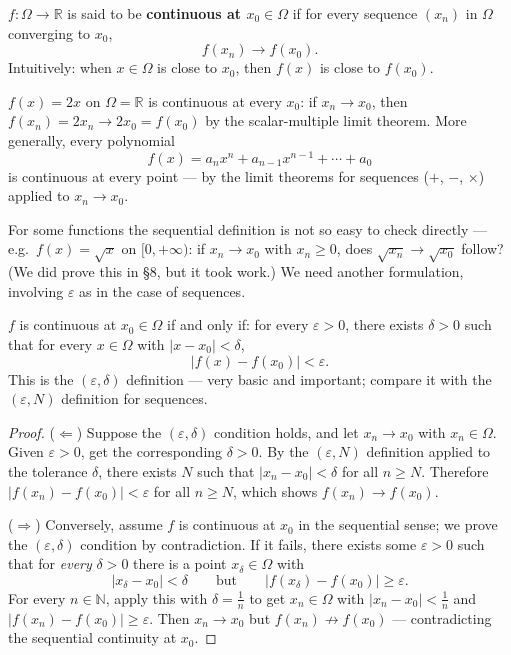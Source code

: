 \documentclass[11pt]{report}
\begin{document}
\begin{defbox}
$f: \Omega \to \mathbb{R}$ is said to be \textbf{continuous at $x_0 \in \Omega$} if for every sequence $(x_n)$ in $\Omega$ converging to $x_0$,
\[
f(x_n) \longrightarrow f(x_0).
\]
Intuitively: when $x \in \Omega$ is close to $x_0$, then $f(x)$ is close to $f(x_0)$.
\end{defbox}

\begin{exbox}
$f(x) = 2x$ on $\Omega = \mathbb{R}$ is continuous at every $x_0$: if $x_n \to x_0$, then $f(x_n) = 2x_n \to 2x_0 = f(x_0)$ by the scalar-multiple limit theorem. More generally, every polynomial
\[
f(x) = a_n x^n + a_{n-1}x^{n-1} + \cdots + a_0
\]
is continuous at every point --- by the limit theorems for sequences ($+$, $-$, $\times$) applied to $x_n \to x_0$.
\end{exbox}

For some functions the sequential definition is not so easy to check directly --- e.g.\ $f(x) = \sqrt{x}$ on $[0, +\infty)$: if $x_n \to x_0$ with $x_n \geq 0$, does $\sqrt{x_n} \to \sqrt{x_0}$ follow? (We did prove this in \S 8, but it took work.) We need another formulation, involving $\varepsilon$ as in the case of sequences.

\begin{thmbox}
$f$ is continuous at $x_0 \in \Omega$ if and only if: for every $\varepsilon > 0$, there exists $\delta > 0$ such that for every $x \in \Omega$ with $|x - x_0| < \delta$,
\[
|f(x) - f(x_0)| < \varepsilon.
\]
This is the $(\varepsilon, \delta)$ definition --- very basic and important; compare it with the $(\varepsilon, N)$ definition for sequences.
\end{thmbox}

\begin{proof}
($\Leftarrow$) Suppose the $(\varepsilon,\delta)$ condition holds, and let $x_n \to x_0$ with $x_n \in \Omega$. Given $\varepsilon > 0$, get the corresponding $\delta > 0$. By the $(\varepsilon, N)$ definition applied to the tolerance $\delta$, there exists $N$ such that $|x_n - x_0| < \delta$ for all $n \geq N$. Therefore $|f(x_n) - f(x_0)| < \varepsilon$ for all $n \geq N$, which shows $f(x_n) \to f(x_0)$.

($\Rightarrow$) Conversely, assume $f$ is continuous at $x_0$ in the sequential sense; we prove the $(\varepsilon,\delta)$ condition by contradiction. If it fails, there exists some $\varepsilon > 0$ such that for \emph{every} $\delta > 0$ there is a point $x_\delta \in \Omega$ with
\[
|x_\delta - x_0| < \delta \qquad \text{but} \qquad |f(x_\delta) - f(x_0)| \geq \varepsilon.
\]
For every $n \in \mathbb{N}$, apply this with $\delta = \tfrac1n$ to get $x_n \in \Omega$ with $|x_n - x_0| < \tfrac1n$ and $|f(x_n) - f(x_0)| \geq \varepsilon$. Then $x_n \to x_0$ but $f(x_n) \not\to f(x_0)$ --- contradicting the sequential continuity at $x_0$.
\end{proof}
\end{document}
